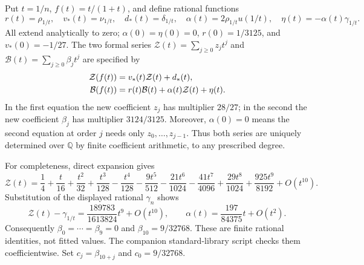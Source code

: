 \documentclass[11pt,letterpaper]{article}
\numberwithin{equation}{section}
\theoremstyle{definition}
\newcommand{\Q}{\mathbb Q}
\newcommand{\1}{\mathbf 1}
\begin{document}
Put $t=1/n$, $f(t)=t/(1+t)$, and define rational functions
\[
 r(t)=\rho_{1/t},\quad v_*(t)=\nu_{1/t},\quad d_*(t)=\delta_{1/t},
 \quad \alpha(t)=2\rho_{1/t}u(1/t),\quad
 \eta(t)=-\alpha(t)\gamma_{1/t}.
\]
All extend analytically to zero; $\alpha(0)=\eta(0)=0$,
$r(0)=1/3125$, and $v_*(0)=-1/27$.
The two formal series $\mathcal Z(t)=\sum_{j\ge0}z_jt^j$ and
$\mathcal B(t)=\sum_{j\ge0}\beta_jt^j$ are specified by
\begin{align}
 \mathcal Z(f(t))&=v_*(t)\mathcal Z(t)+d_*(t),\notag\\
 \mathcal B(f(t))&=r(t)\mathcal B(t)+\alpha(t)\mathcal Z(t)+\eta(t).
 \label{shr:h5:asy:formal}
\end{align}
In the first equation the new coefficient $z_j$ has multiplier $28/27$;
in the second the new coefficient $\beta_j$ has multiplier $3124/3125$.
Moreover, $\alpha(0)=0$ means the second equation at order $j$ needs only
$z_0,\ldots,z_{j-1}$. Thus both series are uniquely determined over $\Q$
by finite coefficient arithmetic, to any prescribed degree.

For completeness, direct expansion gives
\[
 \mathcal Z(t)=\frac14+\frac{t}{16}+\frac{t^2}{32}
 +\frac{t^3}{128}-\frac{t^4}{128}-\frac{9t^5}{512}
 -\frac{21t^6}{1024}-\frac{41t^7}{4096}
 +\frac{29t^8}{1024}+\frac{925t^9}{8192}+O(t^{10}).
\]
Substitution of the displayed rational $\gamma_n$ shows
\[
 \mathcal Z(t)-\gamma_{1/t}
 =\frac{189783}{1613824}t^9+O(t^{10}),\qquad
 \alpha(t)=\frac{197}{84375}t+O(t^2).
\]
Consequently $\beta_0=\cdots=\beta_9=0$ and
$\beta_{10}=9/32768$. These are finite rational identities, not fitted
values. The companion standard-library script checks them coefficientwise.
Set $c_j=\beta_{10+j}$ and $c_0=9/32768$.
\end{document}
